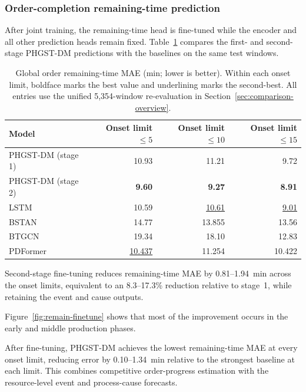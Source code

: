 \documentclass[a4paper,fleqn]{cas-dc}
\begin{document}
\subsubsection{Order-completion remaining-time prediction}\label{sec:comparison-remain}

After joint training, the remaining-time head is fine-tuned while the encoder and all other prediction heads remain fixed. Table~\ref{tab:comparison-remain} compares the first- and second-stage PHGST-DM predictions with the baselines on the same test windows.

\begin{table}[pos=htbp]
\centering
\caption{Global order remaining-time MAE (min; lower is better). Within each onset limit, boldface marks the best value and underlining marks the second-best. All entries use the unified 5,354-window re-evaluation in Section~\ref{sec:comparison-overview}.}
\label{tab:comparison-remain}
\scriptsize
\setlength{\tabcolsep}{3pt}
\renewcommand{\arraystretch}{1.10}
\begin{tabular*}{\columnwidth}{@{\extracolsep{\fill}}lrrr@{}}
\toprule
Model & Onset limit $\leq5$ & Onset limit $\leq10$ & Onset limit $\leq15$ \\
\midrule
PHGST-DM (stage 1) & 10.93 & 11.21 & 9.72 \\
PHGST-DM (stage 2) & \textbf{9.60} & \textbf{9.27} & \textbf{8.91} \\
\midrule
LSTM & 10.59 & \underline{10.61} & \underline{9.01} \\
BSTAN & 14.77 & 13.855 & 13.56 \\
BTGCN & 19.34 & 18.10 & 12.83 \\
PDFormer & \underline{10.437} & 11.254 & 10.422 \\
\bottomrule
\end{tabular*}
\end{table}

Second-stage fine-tuning reduces remaining-time MAE by 0.81--1.94~min across the onset limits, equivalent to an 8.3--17.3\% reduction relative to stage~1, while retaining the event and cause outputs.

Figure~\ref{fig:remain-finetune} shows that most of the improvement occurs in the early and middle production phases.

After fine-tuning, PHGST-DM achieves the lowest remaining-time MAE at every onset limit, reducing error by 0.10--1.34~min relative to the strongest baseline at each limit. This combines competitive order-progress estimation with the resource-level event and process-cause forecasts.
\end{document}
